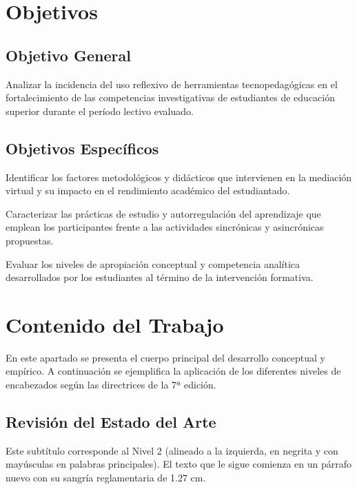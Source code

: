 \documentclass[12pt,letterpaper]{article}
\begin{document}
\clearpage
\section{Objetivos}

\subsection{Objetivo General}
Analizar la incidencia del uso reflexivo de herramientas tecnopedagógicas en el fortalecimiento de las competencias investigativas de estudiantes de educación superior durante el período lectivo evaluado.

\subsection{Objetivos Específicos}
Identificar los factores metodológicos y didácticos que intervienen en la mediación virtual y su impacto en el rendimiento académico del estudiantado.

Caracterizar las prácticas de estudio y autorregulación del aprendizaje que emplean los participantes frente a las actividades sincrónicas y asincrónicas propuestas.

Evaluar los niveles de apropiación conceptual y competencia analítica desarrollados por los estudiantes al término de la intervención formativa.

\clearpage
\section{Contenido del Trabajo}

En este apartado se presenta el cuerpo principal del desarrollo conceptual y empírico. A continuación se ejemplifica la aplicación de los diferentes niveles de encabezados según las directrices de la 7ª edición.

\subsection{Revisión del Estado del Arte}
Este subtítulo corresponde al Nivel 2 (alineado a la izquierda, en negrita y con mayúsculas en palabras principales). El texto que le sigue comienza en un párrafo nuevo con su sangría reglamentaria de 1.27 cm.
\end{document}

